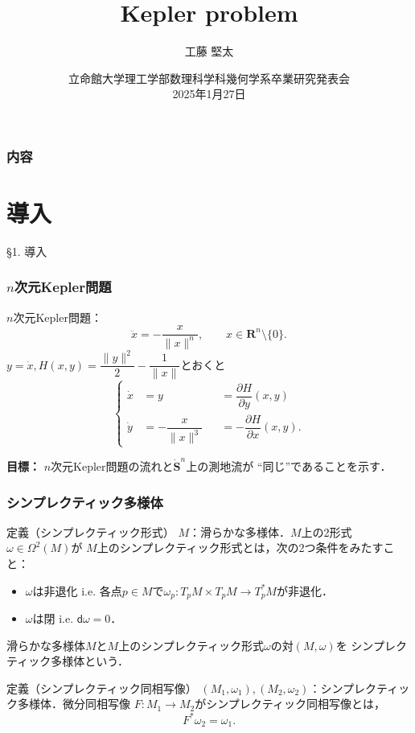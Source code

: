 \documentclass[11pt,%
dvipdfmx,cjk]{beamer}
\title{Kepler problem}
\author{工藤 堅太}
\institute{立命館大学理工学部数理科学科4回}
\date{\footnotesize{立命館大学理工学部数理科学科幾何学系卒業研究発表会 \\2025年1月27日}}
\newcommand{\rr}{\mathbf{R}}
\begin{document}
\begin{frame}\frametitle{}
\titlepage
\end{frame}


\begin{frame}
\frametitle{内容}
\tableofcontents
\end{frame}

\section{導入}
\begin{frame}
\S 1. 導入
\end{frame}

\begin{frame}
\frametitle{\(n\)次元Kepler問題}
\(n\)次元Kepler問題：
\[
	\ddot{x} = - \frac{x}{\|x\|^{n}}, \qquad x \in \rr^{n} \setminus \{0\}.
\]
\(y = \dot{x}, H(x,y) = \dfrac{\|y\|^{2}}{2} - \dfrac{1}{\|x\|}\)とおくと
\[
	\left\{
	\begin{alignedat}{2}   
	\dot{x} &= y &&= \dfrac{\partial H}{\partial y}(x,y) \\
	\dot{y} &= - \dfrac{x}{\|x\|^{3}} &&= - \dfrac{\partial H}{\partial x}(x,y). 
	\end{alignedat}
	\right.
\]
\begin{block}{}
\textbf{目標：}
\(n\)次元Kepler問題の流れと\(\dot{\mathbf{S}}^{n}\)上の測地流が
``同じ''であることを示す．
\end{block}
\end{frame}

\begin{frame}
\frametitle{シンプレクティック多様体}
\begin{block}{定義（シンプレクティック形式）}
$M$：滑らかな多様体．$M$上の2形式$\omega \in \Omega^{2}(M)$が
$M$上のシンプレクティック形式とは，次の2つ条件をみたすこと：
\begin{itemize}
\item 
\(\omega\)は非退化 i.e. 各点\(p \in M\)で\(\omega_{p}: T_{p}M \times T_{p}M \to 
T_{p}^{*}M\)が非退化．

\item
\(\omega\)は閉 i.e. \(\mathsf{d}\omega = 0\)．
\end{itemize}
\end{block}
滑らかな多様体\(M\)と\(M\)上のシンプレクティック形式\(\omega\)の対\((M, \omega)\)を
シンプレクティック多様体という．

\begin{block}{定義（シンプレクティック同相写像）}
$(M_{1}, \omega_{1}), (M_{2},\omega_{2})$：シンプレクティック多様体．微分同相写像
$F\colon M_{1} \to M_{2}$がシンプレクティック同相写像とは，
\[F^{*}\omega_{2} = \omega_{1}.\]
\end{block}
\end{frame}
\end{document}
